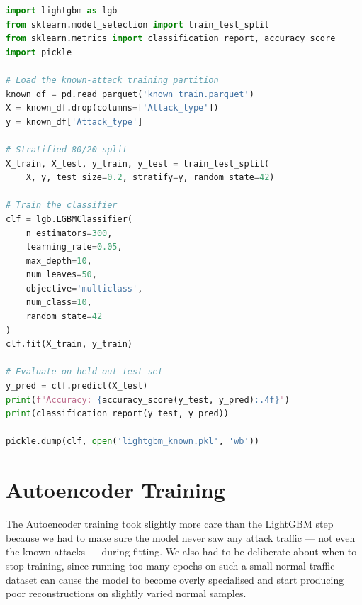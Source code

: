\documentclass[12pt,a4paper]{report}
\begin{document}
\begin{lstlisting}[language=Python, caption={LightGBM training from Notebook 02}]
import lightgbm as lgb
from sklearn.model_selection import train_test_split
from sklearn.metrics import classification_report, accuracy_score
import pickle

# Load the known-attack training partition
known_df = pd.read_parquet('known_train.parquet')
X = known_df.drop(columns=['Attack_type'])
y = known_df['Attack_type']

# Stratified 80/20 split
X_train, X_test, y_train, y_test = train_test_split(
    X, y, test_size=0.2, stratify=y, random_state=42)

# Train the classifier
clf = lgb.LGBMClassifier(
    n_estimators=300,
    learning_rate=0.05,
    max_depth=10,
    num_leaves=50,
    objective='multiclass',
    num_class=10,
    random_state=42
)
clf.fit(X_train, y_train)

# Evaluate on held-out test set
y_pred = clf.predict(X_test)
print(f"Accuracy: {accuracy_score(y_test, y_pred):.4f}")
print(classification_report(y_test, y_pred))

pickle.dump(clf, open('lightgbm_known.pkl', 'wb'))
\end{lstlisting}

\section{Autoencoder Training}

The Autoencoder training took slightly more care than the LightGBM step because
we had to make sure the model never saw any attack traffic — not even the known
attacks — during fitting. We also had to be deliberate about when to stop training,
since running too many epochs on such a small normal-traffic dataset can cause the
model to become overly specialised and start producing poor reconstructions on
slightly varied normal samples.
\end{document}
